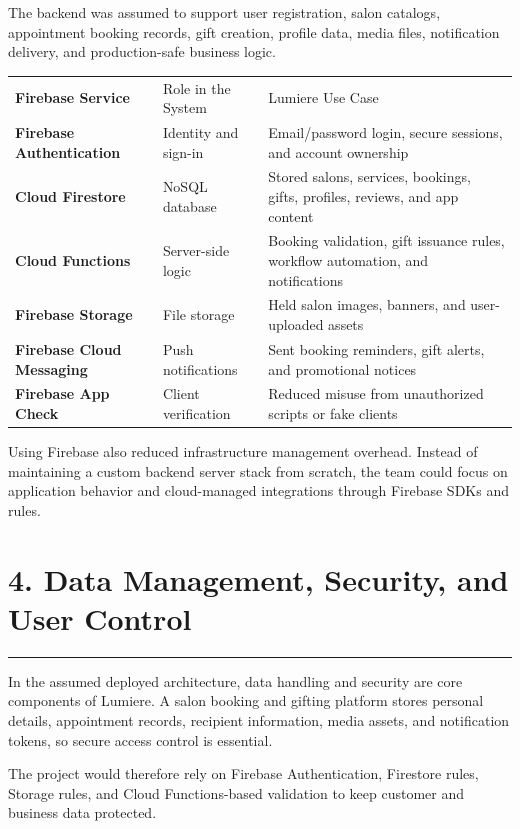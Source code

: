 \documentclass[11pt,a4paper]{article}
\newcommand{\PageTitle}[1]{\section*{#1}\vspace{2pt}\textcolor{LumiereGold}{\rule{\textwidth}{1.1pt}}\vspace{6pt}}
\newcommand{\SmallSpace}{\vspace{4pt}}
\begin{document}
The backend was assumed to support user registration, salon catalogs, appointment booking records, gift creation, profile data, media files, notification delivery, and production-safe business logic.

\begin{tabularx}{\textwidth}{>{\bfseries}p{3.0cm} p{3.1cm} Y}
\color{white}Firebase Service & \color{white}Role in the System & \color{white}Lumiere Use Case \\
Firebase Authentication & Identity and sign-in & Email/password login, secure sessions, and account ownership \\
Cloud Firestore & NoSQL database & Stored salons, services, bookings, gifts, profiles, reviews, and app content \\
Cloud Functions & Server-side logic & Booking validation, gift issuance rules, workflow automation, and notifications \\
Firebase Storage & File storage & Held salon images, banners, and user-uploaded assets \\
Firebase Cloud Messaging & Push notifications & Sent booking reminders, gift alerts, and promotional notices \\
Firebase App Check & Client verification & Reduced misuse from unauthorized scripts or fake clients \\
\end{tabularx}

\SmallSpace
Using Firebase also reduced infrastructure management overhead. Instead of maintaining a custom backend server stack from scratch, the team could focus on application behavior and cloud-managed integrations through Firebase SDKs and rules.

\newpage
\PageTitle{4. Data Management, Security, and User Control}

In the assumed deployed architecture, data handling and security are core components of Lumiere. A salon booking and gifting platform stores personal details, appointment records, recipient information, media assets, and notification tokens, so secure access control is essential.

The project would therefore rely on Firebase Authentication, Firestore rules, Storage rules, and Cloud Functions-based validation to keep customer and business data protected.
\end{document}
